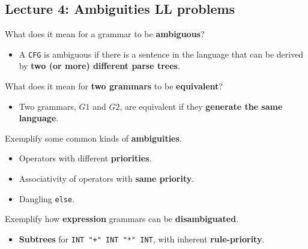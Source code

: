 \documentclass[11pt]{beamer}
\begin{document}
\subsection{Lecture 4: Ambiguities LL problems}
\begin{frame}

\begin{block}{What does it mean for a grammar to be \textbf{ambiguous}?}
\begin{itemize}
\item A \texttt{CFG} is ambiguous if there is a sentence in the language that can be derived by \textbf{two (or more) different parse trees}.
\end{itemize}
\end{block}


\begin{block}{What does it mean for \textbf{two grammars} to be \textbf{equivalent}?}
\begin{itemize}
\item Two grammars, $G1$ and $G2$, are equivalent if they \textbf{generate the same language}.
\end{itemize}
\end{block}

\begin{block}{Exemplify some common kinds of \textbf{ambiguities}.}
\begin{itemize}
\item Operators with different \textbf{priorities}.
\item Associativity of operators with \textbf{same priority}.
\item Dangling \texttt{else}.
\end{itemize}
\end{block}


\begin{block}{Exemplify how \textbf{expression} grammars can be \textbf{disambiguated}.}
\begin{itemize}
\item \textbf{Subtrees} for \texttt{INT "+" INT "*" INT}, with inherent \textbf{rule-priority}.
\end{itemize}
\end{block}

\end{frame}
\end{document}

